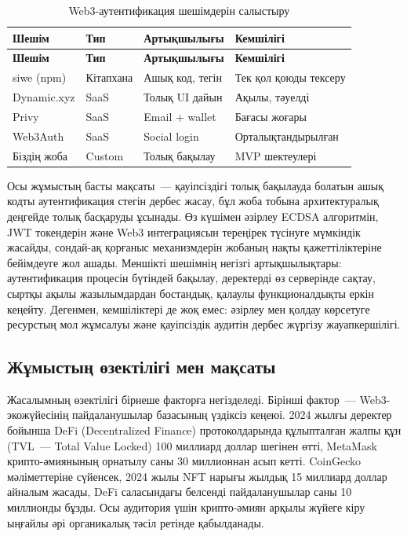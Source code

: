 \documentclass[14pt,a4paper]{extarticle}
\begin{document}
\begin{longtable}{|p{3.0cm}|p{2.6cm}|p{3.7cm}|p{4.8cm}|}
\caption{Web3-аутентификация шешімдерін салыстыру}\label{tab:comparison}\\\hline
\textbf{Шешім} & \textbf{Тип} & \textbf{Артықшылығы} & \textbf{Кемшілігі}\\\hline
\endfirsthead
\hline\textbf{Шешім} & \textbf{Тип} & \textbf{Артықшылығы} & \textbf{Кемшілігі}\\\hline
\endhead
siwe (npm) & Кітапхана & Ашық код, тегін & Тек қол қоюды тексеру\\\hline
Dynamic.xyz & SaaS & Толық UI дайын & Ақылы, тәуелді\\\hline
Privy & SaaS & Email + wallet & Бағасы жоғары\\\hline
Web3Auth & SaaS & Social login & Орталықтандырылған\\\hline
Біздің жоба & Custom & Толық бақылау & MVP шектеулері\\\hline
\end{longtable}

Осы жұмыстың басты мақсаты~--- қауіпсіздігі толық бақылауда болатын ашық кодты аутентификация стегін дербес жасау, бұл жоба тобына архитектуралық деңгейде толық басқаруды ұсынады. Өз күшімен әзірлеу ECDSA алгоритмін, JWT токендерін және Web3 интеграциясын тереңірек түсінуге мүмкіндік жасайды, сондай-ақ қорғаныс механизмдерін жобаның нақты қажеттіліктеріне бейімдеуге жол ашады. Меншікті шешімнің негізгі артықшылықтары: аутентификация процесін бүтіндей бақылау, деректерді өз серверінде сақтау, сыртқы ақылы жазылымдардан бостандық, қалаулы функционалдықты еркін кеңейту. Дегенмен, кемшіліктері де жоқ емес: әзірлеу мен қолдау көрсетуге ресурстың мол жұмсалуы және қауіпсіздік аудитін дербес жүргізу жауапкершілігі.

\subsection{Жұмыстың өзектілігі мен мақсаты}

Жасалымның өзектілігі бірнеше факторға негізделеді. Бірінші фактор~--- Web3-экожүйесінің пайдаланушылар базасының үздіксіз кеңеюі. 2024 жылғы деректер бойынша DeFi (Decentralized Finance) протоколдарында құлыпталған жалпы құн (TVL~--- Total Value Locked) 100 миллиард доллар шегінен өтті, MetaMask крипто-әмиянының орнатылу саны 30 миллионнан асып кетті. CoinGecko мәліметтеріне сүйенсек, 2024 жылы NFT нарығы жылдық 15 миллиард доллар айналым жасады, DeFi саласындағы белсенді пайдаланушылар саны 10 миллионды бұзды. Осы аудитория үшін крипто-әмиян арқылы жүйеге кіру ыңғайлы әрі органикалық тәсіл ретінде қабылданады.
\end{document}
